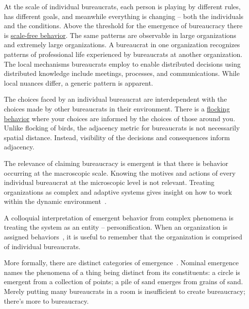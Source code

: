 At the scale of individual bureaucrats, each person is playing by different rules, has different goals, and meanwhile everything is changing -- both the individuals and the conditions. 
Above the threshold for the emergence of bureaucracy there is \href{https://en.wikipedia.org/wiki/Scale_invariance}{scale-free behavior}. 
The same patterns are observable in large organizations and extremely large organizations. A bureaucrat in one organization recognizes patterns of professional life experienced by bureaucrats at another organization. The local mechanisms bureaucrats employ to enable distributed decisions using distributed knowledge include meetings, processes, and communications. While local nuances differ, a generic pattern is apparent. 

The choices faced by an individual bureaucrat are interdependent with the choices made by other bureaucrats in their environment. There is a \href{https://en.wikipedia.org/wiki/Flocking_(behavior)}{flocking behavior} 
\iftoggle{WPinmargin}{\marginpar{[Wikipedia] flocking\\behavior}}{}
where your choices are informed by the choices of those around you. Unlike flocking of birds, the adjacency metric for bureaucrats is not necessarily spatial distance. Instead, visibility of the decisions and consequences inform adjacency.


The relevance of claiming bureaucracy is emergent is that there is behavior occurring at the macroscopic scale. Knowing the motives and actions of every individual bureaucrat at the microscopic level is not relevant. Treating organizations as complex and adaptive systems gives insight on how to work within the dynamic environment~\cite{2011_Eisenhardt}.


A colloquial interpretation of emergent behavior from complex phenomena is treating the system as an entity -- personification.
When an organization is assigned behaviors~\cite{2002_Gall}, it is useful to remember that the organization is comprised of individual bureaucrats. 


More formally, there are distinct categories of emergence~\cite{2002_Bedau, 2021_Carroll_168}. Nominal emergence names the phenomena of a thing being distinct from its constituents: a circle is emergent from a collection of points; a pile of sand emerges from grains of sand. Merely putting many bureaucrats in a room is insufficient to create bureaucracy; there's more to bureaucracy. 

